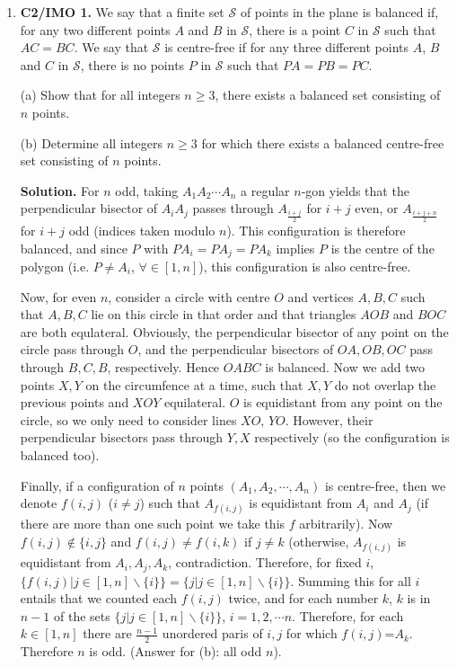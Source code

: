 \documentclass[11pt,a4paper]{article}
\begin{document}
\begin{enumerate}
\item\textbf{C2/IMO 1.} We say that a finite set $\mathcal{S}$ of points in the plane is balanced if, for any two different points $A$ and $B$ in $\mathcal{S}$, there is a point $C$ in $\mathcal{S}$ such that $AC=BC$. We say that $\mathcal{S}$ is centre-free if for any three different points $A$, $B$ and $C$ in $\mathcal{S}$, there is no points $P$ in $\mathcal{S}$ such that $PA=PB=PC$.

(a) Show that for all integers $n\ge 3$, there exists a balanced set consisting of $n$ points.

(b) Determine all integers $n\ge 3$ for which there exists a balanced centre-free set consisting of $n$ points.

\textbf{Solution.} For $n$ odd, taking $A_1A_2\cdots A_n$ a regular $n$-gon yields that the perpendicular bisector of $A_iA_j$ passes through $A_\frac{i+j}{2}$ for $i+j$ even, or $A_\frac{i+j+n}{2}$ for $i+j$ odd (indices taken modulo $n$). This configuration is therefore balanced, and since $P$ with $PA_i=PA_j=PA_k$ implies $P$ is the centre of the polygon (i.e. $P\ne A_i$, $\forall\in[1,n]$), this configuration is also centre-free.

Now, for even $n$, consider a circle with centre $O$ and vertices $A,B,C$ such that $A,B,C$ lie on this circle in that order and that triangles $AOB$ and $BOC$ are both equlateral. Obviously, the perpendicular bisector of any point on the circle pass through $O$, and the perpendicular bisectors of $OA,OB,OC$ pass through $B,C,B$, respectively. Hence $OABC$ is balanced. Now we add two points $X, Y$ on the circumfence at a time, such that $X,Y$ do not overlap the previous points and $XOY$ equilateral. $O$ is equidistant from any point on the circle, so we only need to consider lines $XO$, $YO$. However, their perpendicular bisectors pass through $Y,X$ respectively (so the configuration is balanced too). 

Finally, if a configuration of $n$ points $(A_1, A_2,\cdots , A_n)$ is centre-free, then we denote $f(i,j)$ ($i\ne j$) such that $A_{f(i,j)}$ is equidistant from $A_i$ and $A_j$ (if there are more than one such point we take this $f$ arbitrarily). Now $f(i,j)\not\in\{i,j\}$ and $f(i,j)\ne f(i,k)$ if $j\ne k$ (otherwise, $A_{f(i,j)}$ is equidistant from $A_i, A_j, A_k$, contradiction. Therefore, for fixed $i$, $\{f(i,j)|j\in[1,n]\backslash \{i\}\}=\{j|j\in[1,n]\backslash \{i\}\}$. Summing this for all $i$ entails that we counted each $f(i,j)$ twice, and for each number $k$, $k$ is in $n-1$ of the sets $\{j|j\in[1,n]\backslash \{i\}\}$, $i=1,2,\cdots n$. Therefore, for each $k\in[1,n]$ there are $\frac{n-1}{2}$ unordered paris of $i,j$ for which $f(i,j)$=$A_k$. Therefore $n$ is odd. (Answer for (b): all odd $n$).


\end{enumerate}
\end{document}
